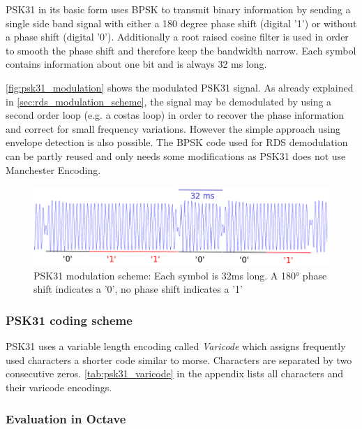 \ac{PSK31} in its basic form uses \ac{BPSK} to transmit binary information by
sending a single side band signal with either a 180 degree phase shift (digital
'1') or without a phase shift (digital '0'). Additionally a root raised cosine
filter is used in order to smooth the phase shift and therefore keep the
bandwidth narrow.  Each symbol contains information about one bit and is always
32 ms long.

\autoref{fig:psk31_modulation} shows the modulated \ac{PSK31} signal. As already
explained in \autoref{sec:rds_modulation_scheme}, the signal may be demodulated
by using a second order loop (e.g. a costas loop) in order to recover the phase
information and correct for small frequency variations. However the simple approach
using envelope detection is also possible. The \ac{BPSK} code used for \ac{RDS}
demodulation can be partly reused and only needs some modifications as \ac{PSK31}
does not use Manchester Encoding.

\begin{figure}
	\centering
	\includegraphics[width=1\linewidth]{gfx/psk31/psk31_modulation.png}
	\caption{PSK31 modulation scheme: Each symbol is 32ms long. A 180° phase
	shift indicates a '0', no phase shift indicates a '1'}
	\label{fig:psk31_modulation}
\end{figure}

\subsubsection{PSK31 coding scheme}

\ac{PSK31} uses a variable length encoding called \emph{Varicode} which assigns
frequently used characters a shorter code similar to morse. Characters are separated
by two consecutive zeros. \autoref{tab:psk31_varicode} in the appendix lists all
characters and their varicode encodings.

\subsubsection{Evaluation in Octave}

